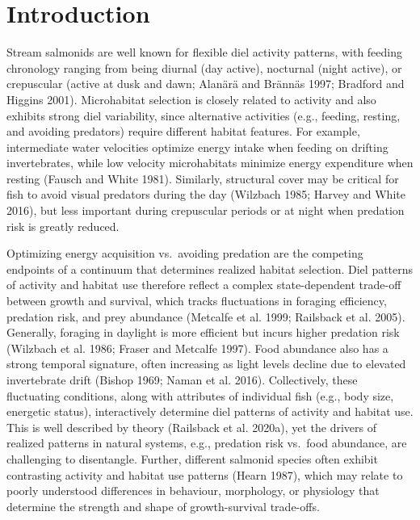 \documentclass[]{article}
\begin{document}
\section{Introduction}\label{introduction}

Stream salmonids are well known for flexible diel activity patterns,
with feeding chronology ranging from being diurnal (day active),
nocturnal (night active), or crepuscular (active at dusk and dawn;
Alanärä and Brännäs 1997; Bradford and Higgins 2001). Microhabitat
selection is closely related to activity and also exhibits strong diel
variability, since alternative activities (e.g., feeding, resting, and
avoiding predators) require different habitat features. For example,
intermediate water velocities optimize energy intake when feeding on
drifting invertebrates, while low velocity microhabitats minimize energy
expenditure when resting (Fausch and White 1981). Similarly, structural
cover may be critical for fish to avoid visual predators during the day
(Wilzbach 1985; Harvey and White 2016), but less important during
crepuscular periods or at night when predation risk is greatly reduced.

Optimizing energy acquisition vs.~avoiding predation are the competing
endpoints of a continuum that determines realized habitat selection.
Diel patterns of activity and habitat use therefore reflect a complex
state-dependent trade-off between growth and survival, which tracks
fluctuations in foraging efficiency, predation risk, and prey abundance
(Metcalfe et al. 1999; Railsback et al. 2005). Generally, foraging in
daylight is more efficient but incurs higher predation risk (Wilzbach et
al. 1986; Fraser and Metcalfe 1997). Food abundance also has a strong
temporal signature, often increasing as light levels decline due to
elevated invertebrate drift (Bishop 1969; Naman et al. 2016).
Collectively, these fluctuating conditions, along with attributes of
individual fish (e.g., body size, energetic status), interactively
determine diel patterns of activity and habitat use. This is well
described by theory (Railsback et al. 2020a), yet the drivers of
realized patterns in natural systems, e.g., predation risk vs.~food
abundance, are challenging to disentangle. Further, different salmonid
species often exhibit contrasting activity and habitat use patterns
(Hearn 1987), which may relate to poorly understood differences in
behaviour, morphology, or physiology that determine the strength and
shape of growth-survival trade-offs.
\end{document}
